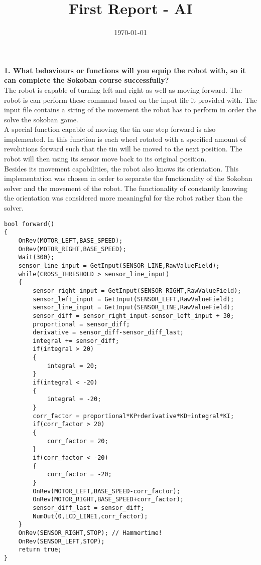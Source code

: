 \documentclass[10pt,a4paper]{article}
\title{First Report - AI}
\date{\today}
\author{}
\begin{document}
\maketitle
\newpage
\textbf{ 1.  What behaviours or functions will you equip the robot with, so it can complete
     the Sokoban course successfully?}\\
     
     The robot is capable of turning left and right as well as moving forward. The robot is can perform these command based on the input file it provided with. The input file contains a string of the movement the robot has to perform in order the solve the sokoban game. \\
     
	A special function capable of moving the tin one step forward is  also implemented. In this function is each wheel rotated  with a specified amount of revolutions forward such that the tin will be moved to the next position. The robot will then using its sensor  move back to its original position. \\

     
     Besides its movement capabilities,  the robot also knows its orientation. This implementation was chosen in order to separate the functionality of the Sokoban solver and the movement of the robot.  The functionality of constantly knowing the orientation was considered more meaningful for the robot rather than the solver. 
     
\begin{lstlisting}
bool forward()
{    
    OnRev(MOTOR_LEFT,BASE_SPEED);
    OnRev(MOTOR_RIGHT,BASE_SPEED); 
    Wait(300); 
    sensor_line_input = GetInput(SENSOR_LINE,RawValueField);
    while(CROSS_THRESHOLD > sensor_line_input)
    {
        sensor_right_input = GetInput(SENSOR_RIGHT,RawValueField);
        sensor_left_input = GetInput(SENSOR_LEFT,RawValueField);
        sensor_line_input = GetInput(SENSOR_LINE,RawValueField);        
        sensor_diff = sensor_right_input-sensor_left_input + 30;
        proportional = sensor_diff;
        derivative = sensor_diff-sensor_diff_last;
        integral += sensor_diff;
        if(integral > 20)
        {
            integral = 20;
        }       
        if(integral < -20)
        {
            integral = -20;
        }
        corr_factor = proportional*KP+derivative*KD+integral*KI;       
        if(corr_factor > 20)
        {
            corr_factor = 20;
        } 
        if(corr_factor < -20)
        {
            corr_factor = -20;
        }        
        OnRev(MOTOR_LEFT,BASE_SPEED-corr_factor);
        OnRev(MOTOR_RIGHT,BASE_SPEED+corr_factor);   
        sensor_diff_last = sensor_diff;
        NumOut(0,LCD_LINE1,corr_factor);
    } 
    OnRev(SENSOR_RIGHT,STOP); // Hammertime!
    OnRev(SENSOR_LEFT,STOP); 
    return true;
}
\end{lstlisting}
     
\end{document}
